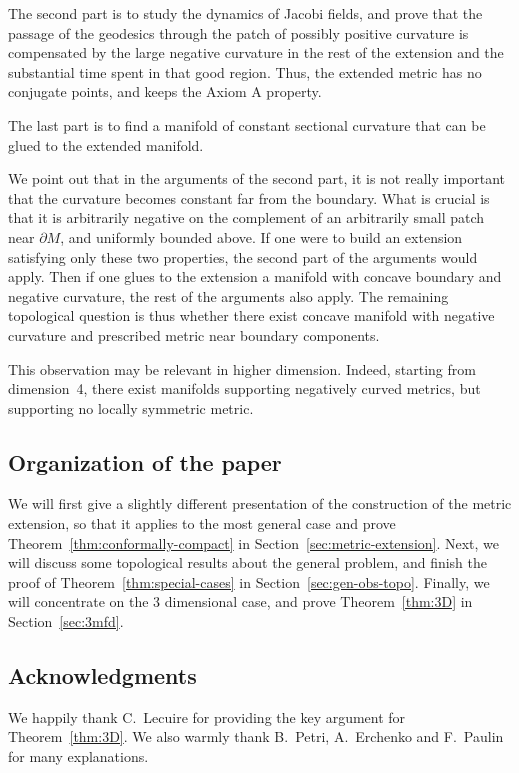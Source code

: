 \documentclass[AHL,Unicode,longabstracts,published]{cedram}
\theoremstyle{plain}
\begin{document}
The second part is to study the dynamics of Jacobi fields, and prove that the passage of the geodesics through the patch of possibly positive curvature is compensated by the large negative curvature in the rest of the extension and the substantial time spent in that good region. Thus, the extended metric has no conjugate points, and keeps the Axiom A property.

The last part is to find a manifold of constant sectional curvature that can be glued to the extended manifold.

We point out that in the arguments of the second part, it is not really important that the curvature becomes constant far from the boundary. What is crucial is that it is arbitrarily negative on the complement of an arbitrarily small patch near $\partial M$, and uniformly bounded above. If one were to build an extension satisfying only these two properties, the second part of the arguments would apply. Then if one glues to the extension a manifold with concave boundary and negative curvature, the rest of the arguments also apply. The remaining topological question is thus whether there exist concave manifold with negative curvature and prescribed metric near boundary components.

This observation may be relevant in higher dimension. Indeed, starting from dimension~4, there exist manifolds supporting negatively curved metrics, but supporting no locally symmetric metric.

\subsection*{Organization of the paper}

We will first give a slightly different presentation of the construction of the metric extension, so that it applies to the most general case and prove Theorem~\ref{thm:conformally-compact} in Section~\ref{sec:metric-extension}. Next, we will discuss some topological results about the general problem, and finish the proof of Theorem~\ref{thm:special-cases} in Section~\ref{sec:gen-obs-topo}. Finally, we will concentrate on the 3 dimensional case, and prove Theorem~\ref{thm:3D} in Section~\ref{sec:3mfd}.

\subsection*{Acknowledgments}

We happily thank C.~Lecuire for providing the key argument for Theorem~\ref{thm:3D}. We also warmly thank B.~Petri, A.~Erchenko and F.~Paulin for many explanations.
\end{document}
